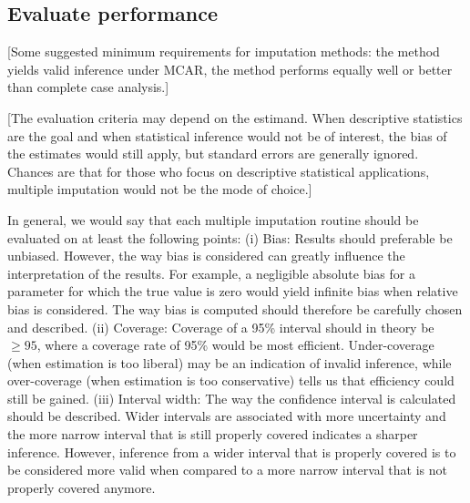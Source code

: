 \documentclass[bimj,fleqn]{w-art}
\begin{document}

\subsection{Evaluate performance}


[Some suggested minimum requirements for imputation methods: the method yields valid inference under MCAR, the method performs equally well or better than complete case analysis.]

[The evaluation criteria may depend on the estimand. When descriptive statistics are the goal and when statistical inference would not be of interest, the bias of the estimates would still apply, but standard errors are generally ignored. Chances are that for those who focus on descriptive statistical applications, multiple imputation would not be the mode of choice.] 

In general, we would say that each multiple imputation routine should be evaluated on at least the following points:
 (i) Bias: Results should preferable be unbiased. However, the way bias is considered can greatly influence the interpretation of the results. For example, a negligible absolute bias for a parameter for which the true value is zero would yield infinite bias when relative bias is considered. The way bias is computed should therefore be carefully chosen and described. 
(ii) Coverage: Coverage of a 95\% interval should in theory be $\geq 95$, where a coverage rate of 95\% would be most efficient. Under-coverage (when estimation is too liberal) may be an indication of invalid inference, while over-coverage (when estimation is too conservative) tells us that efficiency could still be gained. 
(iii) Interval width: The way the confidence interval is calculated should be described. Wider intervals are associated with more uncertainty and the more narrow interval that is still properly covered indicates a sharper inference. However, inference from a wider interval that is properly covered is to be considered more valid when compared to a more narrow interval that is not properly covered anymore. 
\end{document}
